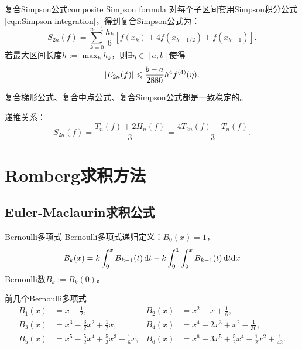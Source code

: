 \begin{example}
    {复合Simpson公式}{composite Simpson formula}
    对每个子区间套用Simpson积分公式\eqref{eqn:Simpson integration}，得到复合Simpson公式为：
    \begin{equation}
        S_{2n}(f)=\sum_{k=0}^{n-1}\frac{h_k}6[f(x_k)+4f(x_{k+1/2})+f(x_{k+1})].
    \end{equation}
    若最大区间长度$h:=\max_kh_k$，则$\exists\eta\in[a,b]$使得
    \begin{equation}
        \left\lvert E_{2n}(f)\right\rvert\leqslant\frac{b-a}{2880}h^4f^{(4)}(\eta).
    \end{equation}
\end{example}

\begin{remark}
    复合梯形公式、复合中点公式、复合Simpson公式都是一致稳定的。
\end{remark}

\begin{corollary}
    递推关系：
    \begin{equation}
        S_{2n}(f)=\frac{T_n(f)+2H_n(f)}3=\frac{4T_{2n}(f)-T_n(f)}3.
    \end{equation}
\end{corollary}

\section{Romberg求积方法}
\label{sec:Romberg's method}

\subsection{Euler-Maclaurin求积公式}

\begin{definition}
    {Bernoulli多项式}{}
    Bernoulli多项式递归定义：$B_0(x)=1$，
    \begin{equation}
        B_k(x)=k\int_0^xB_{k-1}(t)\mathop{}\!\mathrm{d} t-k\int_0^1\int_0^xB_{k-1}(t)\mathop{}\!\mathrm{d} t\mathrm{d} x
    \end{equation}
    Bernoulli数$B_k:=B_k(0)$。
\end{definition}

\begin{example}
    {前几个Bernoulli多项式}{}
    \begin{equation*}
        \begin{aligned}
            B_1(x)&=x-\frac12,&B_2(x)&=x^2-x+\frac16,\\
            B_3(x)&=x^3-\frac32x^2+\frac12x,&B_4(x)&=x^4-2x^3+x^2-\frac1{30},\\
            B_5(x)&=x^5-\frac52x^4+\frac53x^3-\frac16x,&B_6(x)&=x^6-3x^5+\frac52x^4-\frac12x^2+\frac1{42}.
        \end{aligned}
    \end{equation*}
\end{example}

